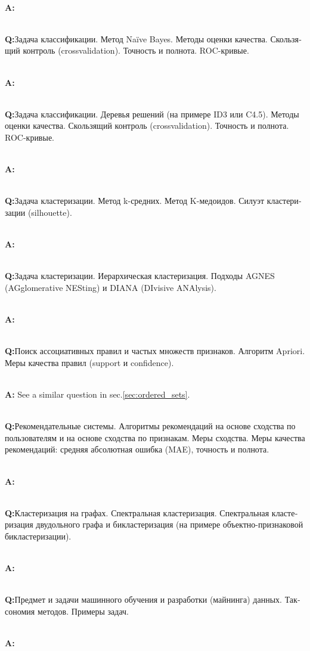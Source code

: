 \documentclass[a4paper]{article}
\newcommand{\rus}[1]{\foreignlanguage{russian}{#1}}
\begin{document}
\hfill\\\textbf{A:}

\hfill\\\textbf{Q:}\rus{Задача классификации.  Метод Naïve Bayes. Методы оценки
качества. Скользящий контроль (crossvalidation). Точность и полнота. ROC-кривые.}

\hfill\\\textbf{A:}

\hfill\\\textbf{Q:}\rus{Задача классификации. Деревья решений (на примере ID3 или
C4.5). Методы оценки качества. Скользящий контроль (crossvalidation). Точность и
полнота. ROC-кривые.}

\hfill\\\textbf{A:}

\hfill\\\textbf{Q:}\rus{Задача кластеризации. Метод k-средних. Метод K-медоидов.
Силуэт кластеризации (silhouette).}

\hfill\\\textbf{A:}

\hfill\\\textbf{Q:}\rus{Задача кластеризации. Иерархическая кластеризация. Подходы
AGNES (AGglomerative NESting) и DIANA (DIvisive ANAlysis).}

\hfill\\\textbf{A:}

\hfill\\\textbf{Q:}\rus{Поиск ассоциативных правил и частых множеств признаков.
Алгоритм Apriori. Меры качества правил (support и confidence).}

\hfill\\\textbf{A:}
See a similar question in sec.\ref{sec:ordered_sets}.

\hfill\\\textbf{Q:}\rus{Рекомендательные системы. Алгоритмы рекомендаций на основе
сходства по пользователям и на основе сходства по признакам. Меры сходства. Меры
качества рекомендаций: средняя абсолютная ошибка (MAE), точность и полнота.}

\hfill\\\textbf{A:}

\hfill\\\textbf{Q:}\rus{Кластеризация на графах. Спектральная кластеризация. Спектральная
кластеризация двудольного графа и бикластеризация (на примере объектно-признаковой
бикластеризации).}

\hfill\\\textbf{A:}

\hfill\\\textbf{Q:}\rus{Предмет и задачи машинного обучения и разработки (майнинга)
данных. Таксономия методов. Примеры задач.}

\hfill\\\textbf{A:}

\end{document}
